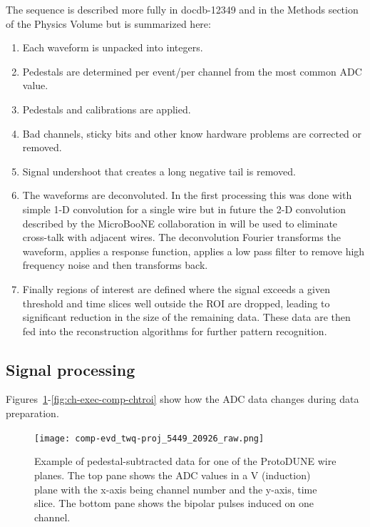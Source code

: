 The sequence is described more fully in docdb-12349 and in the Methods section of the Physics Volume but is summarized here:

\begin{enumerate}
\item Each waveform is unpacked into integers.
\item Pedestals are determined per event/per channel from the most common ADC value. 
\item Pedestals and calibrations are applied. %
\item Bad channels, sticky bits and other know hardware problems are corrected or removed.
\item Signal undershoot that creates a long negative tail is removed. 
\item The waveforms  are deconvoluted.  In the first processing this was done with simple 1-D convolution for a single wire but in future the 2-D convolution described by the MicroBooNE collaboration in  will be used to eliminate cross-talk with adjacent wires.  The deconvolution Fourier transforms the waveform, applies a response function, applies a low pass filter to remove high frequency noise and then transforms back.



\item Finally regions of interest are defined where the signal exceeds a given threshold and time slices well outside the ROI are dropped, leading to significant reduction in the size of the remaining data. These data are then fed into the reconstruction algorithms for further pattern recognition. %
\end{enumerate}




\subsection{Signal processing}
Figures~\ref{fig:ch-exec-comp-chtraw}-\ref{fig:ch-exec-comp-chtroi} show how the ADC data changes during data
preparation.

\begin{figure}[t]
\texttt{[image: comp-evd\_twq-proj\_5449\_20926\_raw.png]}
\caption{
Example of pedestal-subtracted data for one of the ProtoDUNE  wire planes.  The top pane shows the ADC values in a V (induction) plane with the x-axis being channel number and the y-axis, time slice. The bottom pane shows the bipolar pulses induced on one channel. 
}
\label{fig:ch-exec-comp-chtraw}
\end{figure}




